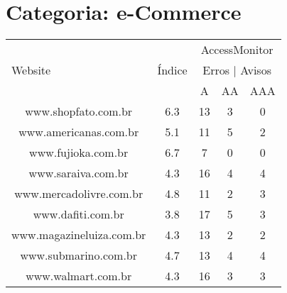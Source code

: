 \section{Categoria: e-Commerce}
\label{sec:apendiceecommerce}
\begin{center}
\begin{longtable}{|l|l|l|l|l|}
\hline
\multirow{3}{277pt}{\centerline{Website}} & 
\multirow{3}{30pt}{\centerline{Índice}} & \multicolumn{3}{c|}{AccessMonitor} \\ 
\cline{3-5}
\multicolumn{1}{|c|}{} & \multicolumn{1}{c|}{} & \multicolumn{3}{c|}{Erros | Avisos		} \\ 
\cline{3-5}
\multicolumn{1}{|c|}{} & \multicolumn{1}{c|}{} & \multicolumn{1}{c|}{A} & \multicolumn{1}{c|}{AA} & \multicolumn{1}{c|}{AAA} \\ 
\hline
\multicolumn{1}{|c|}{www.shopfato.com.br } & \multicolumn{1}{c|}{6.3} & \multicolumn{1}{c|}{13} & \multicolumn{1}{c|}{3} & \multicolumn{1}{c|}{0} \\ 
\hline
\multicolumn{1}{|c|}{www.americanas.com.br} & \multicolumn{1}{c|}{5.1} & \multicolumn{1}{c|}{11} & \multicolumn{1}{c|}{5} & \multicolumn{1}{c|}{2} \\ 
\hline
\multicolumn{1}{|c|}{www.fujioka.com.br} & \multicolumn{1}{c|}{6.7} & \multicolumn{1}{c|}{7} & \multicolumn{1}{c|}{0} & \multicolumn{1}{c|}{0} \\ 
\hline
\multicolumn{1}{|c|}{www.saraiva.com.br} & \multicolumn{1}{c|}{4.3} & \multicolumn{1}{c|}{16} & \multicolumn{1}{c|}{4} & \multicolumn{1}{c|}{4} \\ 
\hline
\multicolumn{1}{|c|}{www.mercadolivre.com.br} & \multicolumn{1}{c|}{4.8} & \multicolumn{1}{c|}{11} & \multicolumn{1}{c|}{2} & \multicolumn{1}{c|}{3} \\ 
\hline
\multicolumn{1}{|c|}{www.dafiti.com.br} & \multicolumn{1}{c|}{3.8} & \multicolumn{1}{c|}{17} & \multicolumn{1}{c|}{5} & \multicolumn{1}{c|}{3} \\ 
\hline
\multicolumn{1}{|c|}{www.magazineluiza.com.br} & \multicolumn{1}{c|}{4.3} & \multicolumn{1}{c|}{13} & \multicolumn{1}{c|}{2} & \multicolumn{1}{c|}{2} \\ 
\hline
\multicolumn{1}{|c|}{www.submarino.com.br} & \multicolumn{1}{c|}{4.7} & \multicolumn{1}{c|}{13} & \multicolumn{1}{c|}{4} & \multicolumn{1}{c|}{4} \\ 
\hline
\multicolumn{1}{|c|}{www.walmart.com.br} & \multicolumn{1}{c|}{4.3} & \multicolumn{1}{c|}{16} & \multicolumn{1}{c|}{3} & \multicolumn{1}{c|}{3} \\ 

\end{longtable}
\end{center}
